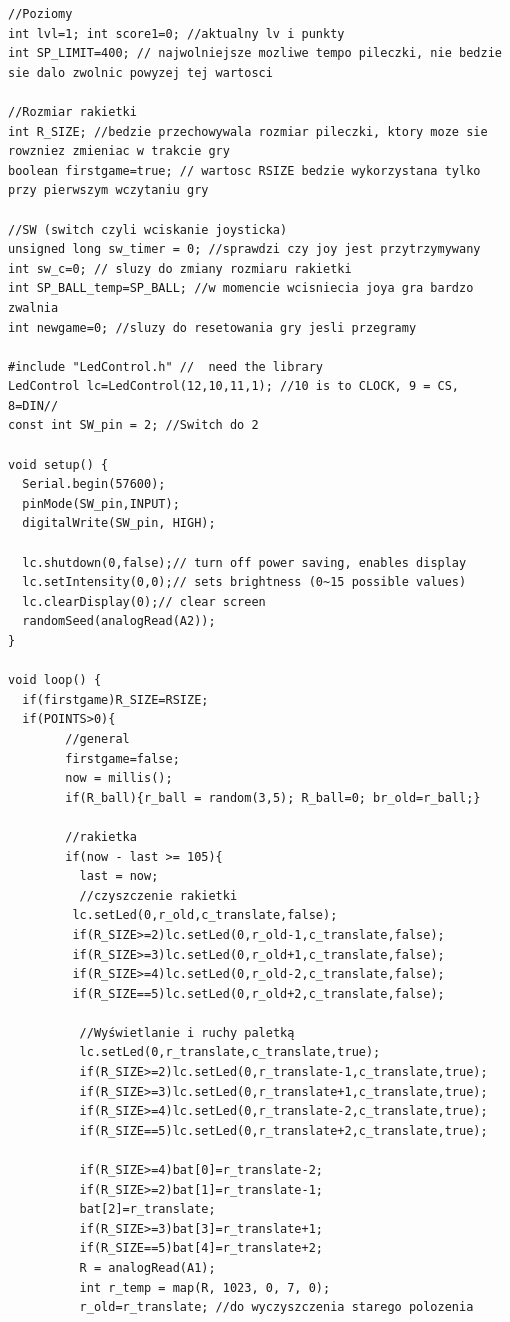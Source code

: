 \documentclass[12pt,notitlepage]{article}
\begin{document}
\begin{lstlisting}[style=CStyle]
//Poziomy
int lvl=1; int score1=0; //aktualny lv i punkty
int SP_LIMIT=400; // najwolniejsze mozliwe tempo pileczki, nie bedzie sie dalo zwolnic powyzej tej wartosci

//Rozmiar rakietki
int R_SIZE; //bedzie przechowywala rozmiar pileczki, ktory moze sie rowzniez zmieniac w trakcie gry
boolean firstgame=true; // wartosc RSIZE bedzie wykorzystana tylko przy pierwszym wczytaniu gry

//SW (switch czyli wciskanie joysticka)
unsigned long sw_timer = 0; //sprawdzi czy joy jest przytrzymywany
int sw_c=0; // sluzy do zmiany rozmiaru rakietki
int SP_BALL_temp=SP_BALL; //w momencie wcisniecia joya gra bardzo zwalnia
int newgame=0; //sluzy do resetowania gry jesli przegramy

#include "LedControl.h" //  need the library
LedControl lc=LedControl(12,10,11,1); //10 is to CLOCK, 9 = CS, 8=DIN//
const int SW_pin = 2; //Switch do 2

void setup() {
  Serial.begin(57600);
  pinMode(SW_pin,INPUT);
  digitalWrite(SW_pin, HIGH);

  lc.shutdown(0,false);// turn off power saving, enables display
  lc.setIntensity(0,0);// sets brightness (0~15 possible values)
  lc.clearDisplay(0);// clear screen
  randomSeed(analogRead(A2));
}

void loop() {
  if(firstgame)R_SIZE=RSIZE;
  if(POINTS>0){
        //general
        firstgame=false;
        now = millis();
        if(R_ball){r_ball = random(3,5); R_ball=0; br_old=r_ball;}      
      
        //rakietka
        if(now - last >= 105){
          last = now;
          //czyszczenie rakietki
         lc.setLed(0,r_old,c_translate,false);
         if(R_SIZE>=2)lc.setLed(0,r_old-1,c_translate,false);
         if(R_SIZE>=3)lc.setLed(0,r_old+1,c_translate,false);
         if(R_SIZE>=4)lc.setLed(0,r_old-2,c_translate,false);
         if(R_SIZE==5)lc.setLed(0,r_old+2,c_translate,false);
          
          //Wyświetlanie i ruchy paletką
          lc.setLed(0,r_translate,c_translate,true);
          if(R_SIZE>=2)lc.setLed(0,r_translate-1,c_translate,true);
          if(R_SIZE>=3)lc.setLed(0,r_translate+1,c_translate,true); 
          if(R_SIZE>=4)lc.setLed(0,r_translate-2,c_translate,true);
          if(R_SIZE==5)lc.setLed(0,r_translate+2,c_translate,true);
          
          if(R_SIZE>=4)bat[0]=r_translate-2;
          if(R_SIZE>=2)bat[1]=r_translate-1;
          bat[2]=r_translate;
          if(R_SIZE>=3)bat[3]=r_translate+1;
          if(R_SIZE==5)bat[4]=r_translate+2;
          R = analogRead(A1);
          int r_temp = map(R, 1023, 0, 7, 0);
          r_old=r_translate; //do wyczyszczenia starego polozenia
           

\end{lstlisting}
\end{document}
